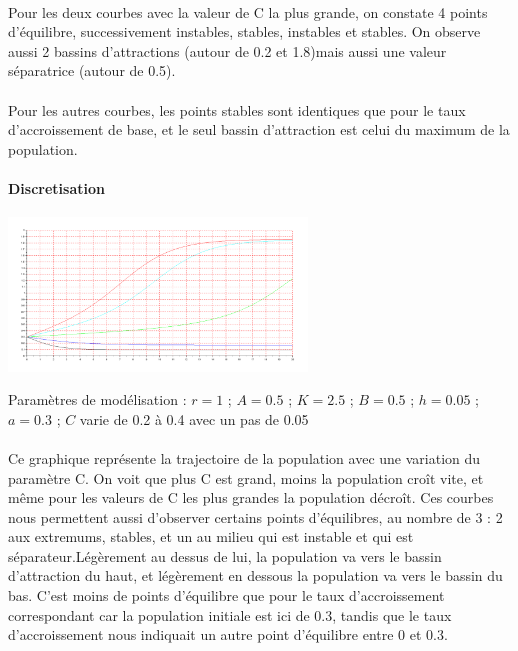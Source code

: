 \documentclass{article}
\begin{document}
\paragraph{}
Pour les deux courbes avec la valeur de C la plus grande, on constate 4 points d'équilibre, successivement instables, stables, instables et stables. On observe aussi 2 bassins d'attractions (autour de 0.2 et 1.8)mais aussi une valeur séparatrice (autour de 0.5).
\paragraph{}
Pour les autres courbes, les points stables sont identiques que pour le taux d'accroissement de base, et le seul bassin d'attraction est celui du maximum de la population.

\paragraph{Discretisation}
\begin{center}
\includegraphics[width=300px]{img/part2/TrajC.png}
\end{center}
Paramètres de modélisation :  $r=1$ ; $A=0.5$ ; $K=2.5$ ; $B=0.5$ ; $h=0.05$ ; $a=0.3$ ; $C$ varie de 0.2 à 0.4 avec un pas de 0.05
\paragraph{}
Ce graphique représente la trajectoire de la population avec une variation du paramètre C.  On voit que plus C est grand, moins la population croît vite, et même pour les valeurs de C les plus grandes la population décroît. Ces courbes nous permettent aussi d'observer certains points d'équilibres, au nombre de 3 : 2 aux extremums, stables, et un au milieu qui est instable et qui est séparateur.Légèrement au dessus de lui, la population va vers le bassin d'attraction du haut, et légèrement en dessous la population va vers le bassin du bas. C'est moins de points d'équilibre que pour le taux d'accroissement correspondant car la population initiale est ici de 0.3, tandis que le taux d'accroissement nous indiquait un autre point d'équilibre entre 0 et 0.3.
\end{document}
